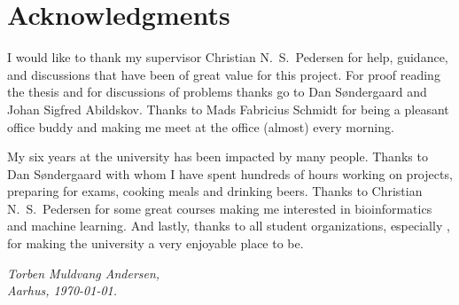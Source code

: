 \chapter{Acknowledgments}

I would like to thank my supervisor Christian N.\ S.\ Pedersen for help,
guidance, and discussions that have been of great value for this project. For
proof reading the thesis and for discussions of problems thanks go to Dan
Søndergaard and Johan Sigfred Abildskov. Thanks to Mads Fabricius Schmidt for
being a pleasant office buddy and making me meet at the office (almost) every
morning.

My six years at the university has been impacted by many people. Thanks to Dan
Søndergaard with whom I have spent hundreds of hours working on projects,
preparing for exams, cooking meals and drinking beers. Thanks to Christian N.\
S.\ Pedersen for some great courses making me interested in bioinformatics and
machine learning. And lastly, thanks to all student organizations, especially
\TKET{}, for making the university a very enjoyable place to be.

\vspace{2ex}
\begin{flushright}
  \emph{Torben Muldvang Andersen,}\\
  \emph{Aarhus, \today.}
\end{flushright}

\cleardoublepage{}


